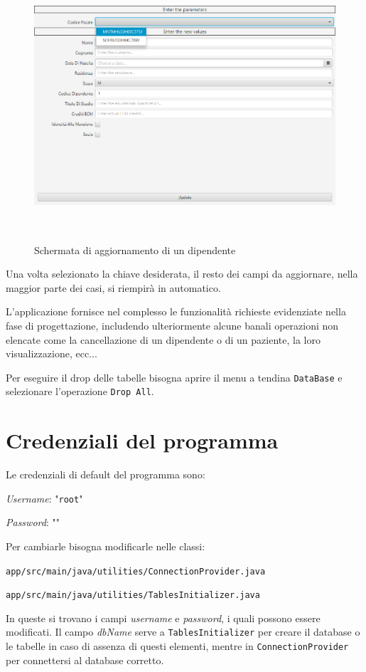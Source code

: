 \documentclass[a4paper, 12pt]{report}
\newenvironment{packed_itemize}{
\begin{itemize}
        \setlength{\itemsep}{1pt}
        \setlength{\parskip}{0pt}
        \setlength{\parsep}{0pt}
}{\end{itemize}}
\begin{document}
\begin{figure}[H]
        \centering
        \includegraphics[height=10cm]{img/schermataAggiornaApp.png}
        \caption{Schermata di aggiornamento di un dipendente}
\end{figure}
\noindent
Una volta selezionato la chiave desiderata, il resto dei campi da aggiornare, nella maggior parte dei casi, si riempirà in automatico.

\bigskip
\noindent
L’applicazione fornisce nel complesso le funzionalità richieste evidenziate nella fase di progettazione, includendo 
ulteriormente alcune banali operazioni non elencate come la cancellazione di un dipendente o di un paziente, la loro visualizzazione, ecc...

\bigskip
\noindent
Per eseguire il drop delle tabelle bisogna aprire il menu a tendina \texttt{DataBase} e selezionare l'operazione \texttt{Drop All}.

\section{Credenziali del programma}
Le credenziali di default del programma sono:
\begin{packed_itemize}
        \item \textit{Username}: "\texttt{root}" 
        \item \textit{Password}: "\texttt{}"
\end{packed_itemize}
Per cambiarle bisogna modificarle nelle classi:
\begin{packed_itemize}
        \item \texttt{app/src/main/java/utilities/ConnectionProvider.java}
        \item \texttt{app/src/main/java/utilities/TablesInitializer.java}
\end{packed_itemize}
In queste si trovano i campi \textit{username} e \textit{password}, i quali possono essere
modificati. Il campo \textit{dbName} serve a \texttt{TablesInitializer} per creare il database o le tabelle in caso
di assenza di questi elementi, mentre in \texttt{ConnectionProvider} per connettersi al database corretto.
\end{document}
